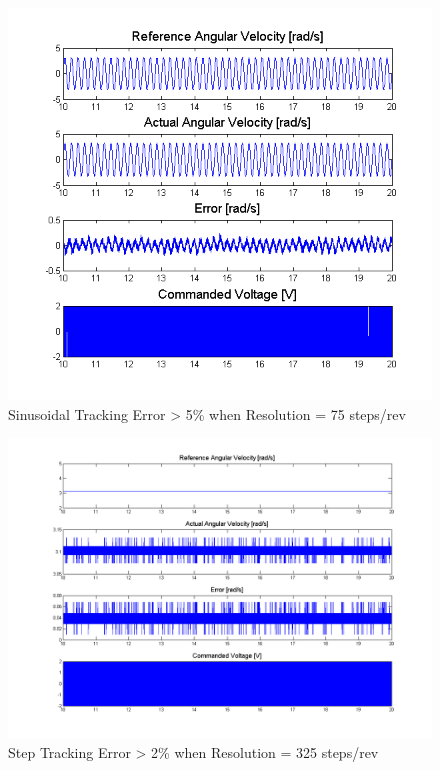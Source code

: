 \documentclass{article}
\theoremstyle{plain}
\theoremstyle{definition}
\theoremstyle{remark}
\begin{document}
\begin{figure}[htb]
\begin{center}
\includegraphics[width = 14cm]{q5c_sine_75.png}
\caption{Sinusoidal Tracking Error > 5\% when Resolution = 75 steps/rev}
\label{q5_c1}
\end{center}
\end{figure}

\begin{figure}[htb]
\begin{center}
\includegraphics[width = 14cm]{q5c_step_325.png}
\caption{Step Tracking Error > 2\% when Resolution = 325 steps/rev}
\label{q5_c2}
\end{center}
\end{figure}
\end{document}
